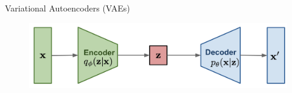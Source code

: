 \begin{frame}{Variational Autoencoders (VAEs)}
    \begin{figure}
        \centering
        \includegraphics[width=0.8\linewidth]{images/vae.png}
    \end{figure}
\end{frame}